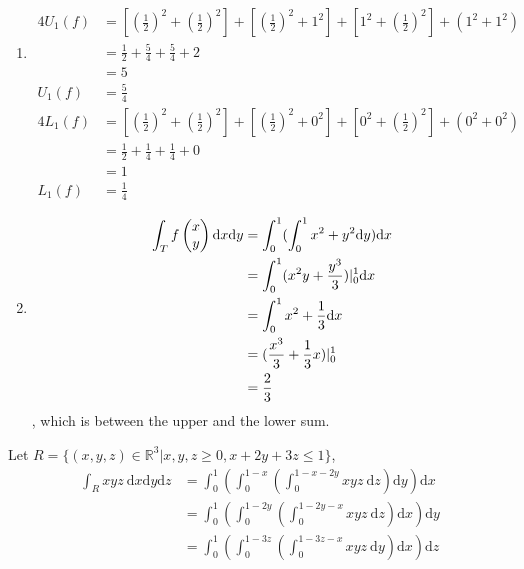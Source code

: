 \documentclass{homework}
\begin{document}
\begin{problem}{2}
\begin{enumerate}
\item
\begin{align*}
4U_1(f) &= [(\frac{1}{2})^2 + (\frac{1}{2})^2] + [(\frac{1}{2})^2 + 1^2]
         + [1^2 + (\frac{1}{2})^2] + (1^2 + 1^2) \\
        &= \frac{1}{2} + \frac{5}{4} + \frac{5}{4} + 2 \\
        &= 5 \\
 U_1(f) &= \frac{5}{4}
\end{align*}
\begin{align*}
4L_1(f) &= [(\frac{1}{2})^2 + (\frac{1}{2})^2] + [(\frac{1}{2})^2 + 0^2]
         + [0^2 + (\frac{1}{2})^2] + (0^2 + 0^2) \\
        &= \frac{1}{2} + \frac{1}{4} + \frac{1}{4} + 0 \\
        &= 1 \\
 L_1(f) &= \frac{1}{4}
\end{align*}

\item
\begin{align*}
\int_T f\begin{pmatrix}x\\y\end{pmatrix} \mathrm{d}x \mathrm{d}y
&= \int_0^1(\int_0^1 x^2+y^2 \mathrm{d}y) \mathrm{d}x \\
&= \int_0^1 (x^2y + \frac{y^3}{3}) |_0^1 \mathrm{d}x \\
&= \int_0^1 x^2 + \frac{1}{3} \mathrm{d}x \\
&= (\frac{x^3}{3} + \frac{1}{3}x)|_0^1 \\
&= \frac{2}{3}
\end{align*}
, which is between the upper and the lower sum.
\end{enumerate}
\end{problem}

\begin{problem}{5}
Let $R = \{(x,y,z) \in \mathbb{R}^3 | x,y,z\geq0, x+2y+3z \leq 1\}$,
\begin{align*}
\int_R xyz\ \mathrm{d}x\mathrm{d}y\mathrm{d}z
&=\int_0^1(\int_0^{1-x}(\int_0^{1-x-2y}xyz\ \mathrm{d}z)\mathrm{d}y)\mathrm{d}x
\\
&=\int_0^1(\int_0^{1-2y}(\int_0^{1-2y-x}xyz\ \mathrm{d}z)\mathrm{d}x)\mathrm{d}y
\\
&=\int_0^1(\int_0^{1-3z}(\int_0^{1-3z-x}xyz\ \mathrm{d}y)\mathrm{d}x)\mathrm{d}z
\end{align*}
\end{problem}
\end{document}
